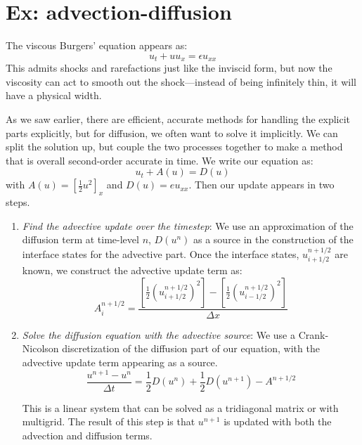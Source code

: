 \section{Ex: advection-diffusion}

The viscous Burgers' equation appears as:
\begin{equation}
u_t + u u_x = \epsilon u_{xx}
\end{equation}
This admits shocks and rarefactions just like the inviscid form, but now
the viscosity can act to smooth out the shock---instead of being
infinitely thin, it will have a physical width.

As we saw earlier, there are efficient, accurate methods for handling
the explicit parts explicitly, but for diffusion, we often want to 
solve it implicitly.  We can split the solution up, but couple the 
two processes together to make a method that is overall second-order
accurate in time.  We write our equation as:
\begin{equation}
u_t + A(u) = D(u)
\end{equation}
with $A(u) = [\frac{1}{2} u^2]_x$ and $D(u) = eu_{xx}$.  Then our update 
appears in two steps.
\begin{enumerate}
\item {\em Find the advective update over the timestep}:
   We use an approximation of the diffusion term at time-level $n$, $D(u^n)$
   as a source in the construction of the interface states for the 
   advective part.  Once the interface states, $u_{i+1/2}^{n+1/2}$ are
   known, we construct the advective update term as:
   \begin{equation}
   A_i^{n+1/2} = 
     \frac{\left [ \frac{1}{2} \left (u_{i+1/2}^{n+1/2}\right)^2\right ] -
           \left [ \frac{1}{2} \left (u_{i-1/2}^{n+1/2}\right)^2\right ]}
          {\Delta x}
    \end{equation}

\item {\em Solve the diffusion equation with the advective source}:
    We use a Crank-Nicolson discretization of the diffusion part of 
    our equation, with the advective update term appearing as a source.
    \begin{equation}
    \frac{u^{n+1} - u^n}{\Delta t} = 
        \frac{1}{2}D(u^n) + \frac{1}{2}D(u^{n+1}) - A^{n+1/2}
    \end{equation}
    
    This is a linear system that can be solved as a tridiagonal matrix
    or with multigrid.  The result of this step is that $u^{n+1}$ is
    updated with both the advection and diffusion terms.

\end{enumerate}

